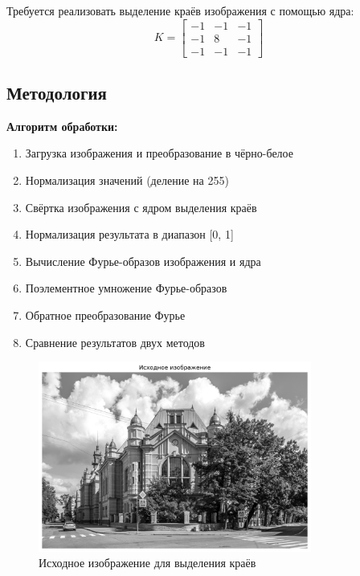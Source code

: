 Требуется реализовать выделение краёв изображения с помощью ядра:
\begin{equation}
K = \begin{bmatrix}
-1 & -1 & -1 \\
-1 & 8 & -1 \\
-1 & -1 & -1
\end{bmatrix}
\end{equation}

\subsection*{Методология}

\textbf{Алгоритм обработки:}
\begin{enumerate}
    \item Загрузка изображения и преобразование в чёрно-белое
    \item Нормализация значений (деление на 255)
    \item Свёртка изображения с ядром выделения краёв
    \item Нормализация результата в диапазон [0, 1]
    \item Вычисление Фурье-образов изображения и ядра
    \item Поэлементное умножение Фурье-образов
    \item Обратное преобразование Фурье
    \item Сравнение результатов двух методов
\end{enumerate}

\begin{figure}[H]
    \centering
    \includegraphics[width=0.8\textwidth]{images/task4/original_image.png}
    \caption{Исходное изображение для выделения краёв}
    \label{fig:original_edge}
\end{figure}

